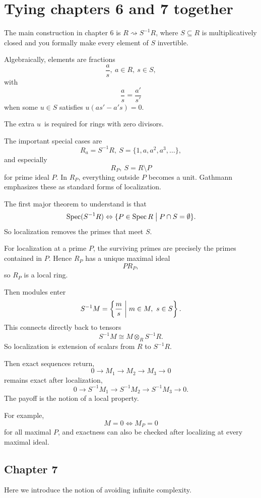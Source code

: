 \documentclass[11pt]{article}
\begin{document}
\section{Tying chapters 6 and 7 together}

The main construction in chapter $6$ is 
$R \rightsquigarrow S^{-1}R$, where 
$S \subseteq R$ is multiplicatively closed and 
you formally make every element of $S$ invertible. 

Algebraically, elements are fractions 
\[
    \frac{a}{s}, \ a \in R, \ s \in S, 
\]
with 
\[
    \frac{a}{s} = \frac{a'}{s'}
\]
when some $u\in S$ satisfies 
$u(as' - a's) = 0$. 

The extra $u$ is required for rings with zero divisors. 

The important special cases are 
\[
    R_a = S^{-1}R, \ S = \{1,a,a^2,a^3,\ldots\},
\]
and especially 
\[
    R_P, \ S = R\setminus P 
\]
for prime ideal $P$. In $R_P$, everything outside 
$P$ becomes a unit. Gathmann emphasizes these as standard 
forms of localization. 

The first major theorem to understand is that 
\[
    \operatorname{Spec}(S^{-1}R) \Leftrightarrow 
    \{P \in \operatorname{Spec}R \bigm| P \cap S = \emptyset\}.  
\]
So localization removes the primes that 
meet $S$. 

For localization at a prime $P$, the surviving 
primes are precisely the primes contained in $P$. 
Hence $R_P$ has a unique maximal ideal 
\[
    PR_P,
\]
so $R_P$ is a local ring. 

Then modules enter 
\[
    S^{-1}M = \left\{\frac{m}s \biggm| m\in M, \ s \in S\right\}.
\]
This connects directly back to tensors 
\[
    S^{-1}M \cong M \otimes_R S^{-1}R.
\]
So localization is extension of scalars from 
$R$ to $S^{-1}R$. 

Then exact sequences return, 
\[
    0 \to M_1 \to M_2 \to M_3 \to 0
\]
remains exact after localization, 
\[
    0 \to S^{-1}M_1 \to 
    S^{-1}M_2 \to S^{-1}M_3 \to 0. 
\]
The payoff is the notion of a local property. 

For example, 
\[
    M = 0 \Leftrightarrow M_P = 0
\]
for all maximal $P$, and exactness can also 
be checked after localizing at every maximal ideal. 

\subsection{Chapter 7}

Here we introduce the notion of avoiding 
infinite complexity. 
\end{document}
